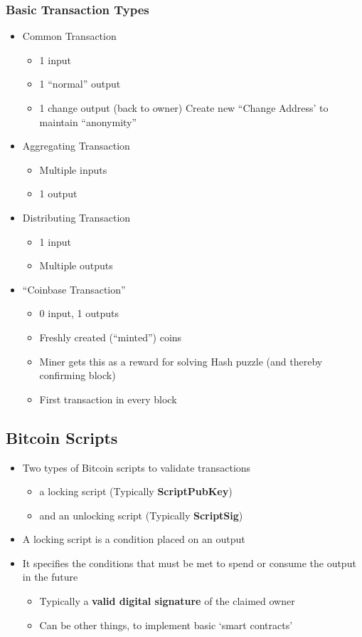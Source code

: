 \subsubsection{Basic Transaction Types}
\begin{itemize}
	\item Common Transaction
	\begin{itemize}
		\item 1 input
		\item 1 ``normal'' output
		\item 1 change output (back to owner)
		\subitem Create new ``Change Address' to maintain ``anonymity''
	\end{itemize}
	\item Aggregating Transaction
	\begin{itemize}
		\item Multiple inputs
		\item 1 output
	\end{itemize}
	\item Distributing Transaction
	\begin{itemize}
		\item 1 input
		\item Multiple outputs
	\end{itemize}
	\item ``Coinbase Transaction''
	\begin{itemize}
		\item 0 input, 1 outputs
		\item Freshly created (``minted'') coins
		\item Miner gets this as a reward for solving Hash puzzle (and thereby confirming block)
		\item First transaction in every block
	\end{itemize}
\end{itemize}

\subsection{Bitcoin Scripts}
\begin{itemize}
	\item Two types of Bitcoin scripts to validate transactions
	\begin{itemize}
		\item a locking script (Typically \textbf{ScriptPubKey})
		\item and an unlocking script (Typically \textbf{ScriptSig})
	\end{itemize}
	\item A locking script is a condition placed on an output
	\item It specifies the conditions that must be met to spend or consume the output in the future
	\begin{itemize}
		\item Typically a \textbf{valid digital signature} of the claimed owner
		\item Can be other things, to implement basic `smart contracts'
	\end{itemize}
\end{itemize}
